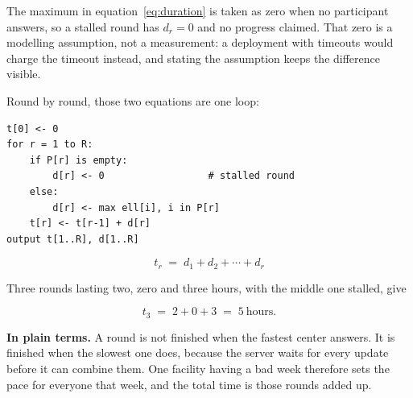 The maximum in equation~\eqref{eq:duration} is taken as zero when no participant answers, so a
stalled round has $d_r = 0$ and no progress claimed. That zero is a modelling assumption, not a
measurement: a deployment with timeouts would charge the timeout instead, and stating the
assumption keeps the difference visible.

\noindent
Round by round, those two equations are one loop:

{\small
\begin{verbatim}
t[0] <- 0
for r = 1 to R:
    if P[r] is empty:
        d[r] <- 0                  # stalled round
    else:
        d[r] <- max ell[i], i in P[r]
    t[r] <- t[r-1] + d[r]
output t[1..R], d[1..R]
\end{verbatim}
}

\noindent
\[
t_r \;=\; d_1 + d_2 + \cdots + d_r
\]

\noindent
Three rounds lasting two, zero and three hours, with the middle one stalled, give

\[
t_3 \;=\; 2 + 0 + 3 \;=\; 5\ \text{hours}.
\]

\noindent\textbf{In plain terms.} A round is not finished when the fastest center answers. It is
finished when the slowest one does, because the server waits for every update before it can
combine them. One facility having a bad week therefore sets the pace for everyone that week, and
the total time is those rounds added up.
